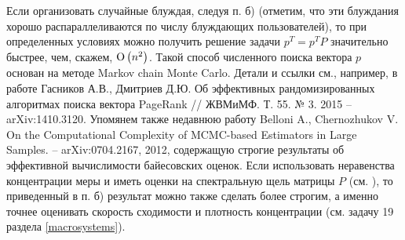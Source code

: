 \begin{remark}
\begin{comment}
Матрица $P^n = \Vert p_{ij}^{(n)} \Vert$ является матрицей переходных вероятностей за $n$ шагов. Число
\[
    d(j) = \text{НОД} \left\{n : p_{jj}^{(n)} > 0 \right\},
\]
где $\gcd$ обозначает наибольший общий делитель, называется \textit{периодом} вершины $j$. Если $d(j) = 1$, то  вершина называется апериодической. Для неразложимой $P$ периоды у всех вершин совпадают. Соответственно,  стохастическая матрица $P$ называется апериодической, если $\forall j: \; d(j) = 1$.
\end{comment}
Если организовать случайные блуждая, следуя п. б) 
(отметим, что эти блуждания хорошо распараллеливаются по числу 
блуждающих пользователей), то при определенных условиях можно получить решение задачи  ${p}^T = {p}^TP$ значительно быстрее, чем, скажем, ${\rm O}\left( {n^2} \right)$. Такой способ численного поиска вектора $ {p}$ основан на методе Markov 
chain Monte Carlo. %
Детали и ссылки см., например, в работе Гасников А.В., Дмитриев Д.Ю. Об эффективных рандомизированных алгоритмах поиска вектора PageRank // ЖВМиМФ. Т. 55. № 3. 2015 -- arXiv:1410.3120. Упомянем также недавнюю работу Belloni A., Chernozhukov V. On the Computational Complexity of MCMC-based Estimators in Large Samples. -- arXiv:0704.2167, 2012, содержащую строгие результаты об эффективной вычислимости байесовских оценок. Если 
использовать неравенства концентрации меры и иметь оценки на спектральную 
щель матрицы $P$ (см. \cite{44,240}), то приведенный в п. 
б) результат можно также сделать  более строгим, а именно точнее 
оценивать скорость сходимости и плотность концентрации (см.  задачу 19 раздела \ref{macrosystems}).
\end{remark}

